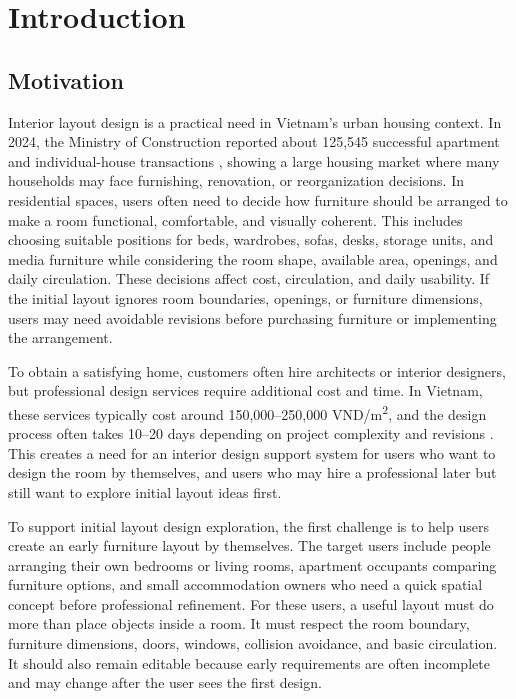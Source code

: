\chapter{Introduction}

\section{Motivation}

Interior layout design is a practical need in Vietnam's urban housing context. In 2024, the Ministry of Construction reported about 125,545 successful apartment and individual-house transactions \cite{Vietnam2025InformationHousingReal}, showing a large housing market where many households may face furnishing, renovation, or reorganization decisions. In residential spaces, users often need to decide how furniture should be arranged to make a room functional, comfortable, and visually coherent. This includes choosing suitable positions for beds, wardrobes, sofas, desks, storage units, and media furniture while considering the room shape, available area, openings, and daily circulation. These decisions affect cost, circulation, and daily usability. If the initial layout ignores room boundaries, openings, or furniture dimensions, users may need avoidable revisions before purchasing furniture or implementing the arrangement.

To obtain a satisfying home, customers often hire architects or interior designers, but professional design services require additional cost and time. In Vietnam, these services typically cost around 150,000–250,000 VND/m\textsuperscript{2}, and the design process often takes 10–20 days depending on project complexity and revisions \cite{NoiThatMansion2026ApartmentDesignPrice,Hometalk2026ApartmentInteriorDesignPrice}. This creates a need for an interior design support system for users who want to design the room by themselves, and users who may hire a professional later but still want to explore initial layout ideas first.

To support initial layout design exploration, the first challenge is to help users create an early furniture layout by themselves. The target users include people arranging their own bedrooms or living rooms, apartment occupants comparing furniture options, and small accommodation owners who need a quick spatial concept before professional refinement. For these users, a useful layout must do more than place objects inside a room. It must respect the room boundary, furniture dimensions, doors, windows, collision avoidance, and basic circulation. It should also remain editable because early requirements are often incomplete and may change after the user sees the first design.

